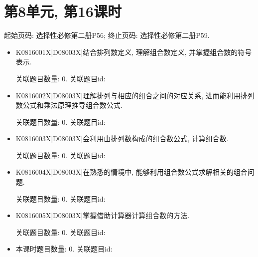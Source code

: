 \section*{第8单元, 第16课时}
起始页码: 选择性必修第二册P56; 终止页码: 选择性必修第二册P59.
\begin{itemize}
\item K0816001X|D08003X|结合排列数定义, 理解组合数定义, 并掌握组合数的符号表示.

关联题目数量: 0. 关联题目id: 

\item K0816002X|D08003X|理解排列与相应的组合之间的对应关系, 进而能利用排列数公式和乘法原理推导组合数公式.

关联题目数量: 0. 关联题目id: 

\item K0816003X|D08003X|会利用由排列数构成的组合数公式, 计算组合数.

关联题目数量: 0. 关联题目id: 

\item K0816004X|D08003X|在熟悉的情境中, 能够利用组合数公式求解相关的组合问题.

关联题目数量: 0. 关联题目id: 

\item K0816005X|D08003X|掌握借助计算器计算组合数的方法.

关联题目数量: 0. 关联题目id: 

\item 本课时题目数量: 0. 关联题目id: 

\end{itemize}

